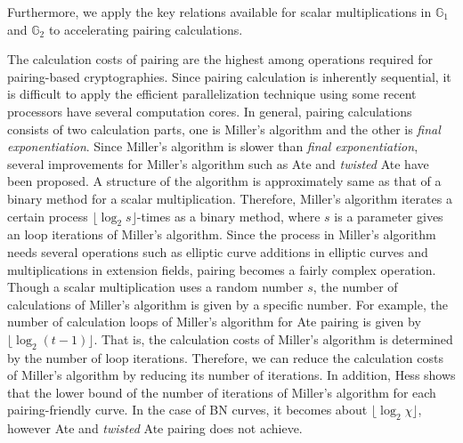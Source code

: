 Furthermore, we apply the key relations available for scalar multiplications in $\mathbb{G}_1$ and $\mathbb{G}_2$ to accelerating pairing calculations.

The calculation costs of pairing are the highest among operations required for pairing-based cryptographies.
Since pairing calculation is inherently sequential, it is difficult to apply the efficient parallelization technique using some recent processors have several computation cores.
In general, pairing calculations consists of two calculation parts, one is Miller's algorithm and the other is {\it final exponentiation}.
Since Miller's algorithm is slower than {\it final exponentiation}, several improvements for Miller's algorithm such as Ate and {\it twisted} Ate have been proposed.
A structure of the algorithm is approximately same as that of a binary method for a scalar multiplication.
Therefore, Miller's algorithm iterates a certain process $\lfloor \log_2 s \rfloor$-times as a binary method, where $s$ is a parameter gives an loop iterations of Miller's algorithm.
Since the process in Miller's algorithm needs several operations such as elliptic curve additions in elliptic curves and multiplications in extension fields, pairing becomes a fairly complex operation. 
Though a scalar multiplication uses a random number $s$, the number of calculations of Miller's algorithm is given by a specific number.
For example, the number of calculation loops of Miller's algorithm for Ate pairing is given by $\lfloor \log_2 (t-1) \rfloor$.
That is, the calculation costs of Miller's algorithm is determined by the number of loop iterations.
Therefore, we can reduce the calculation costs of Miller's algorithm by reducing its number of iterations.
In addition, Hess shows that the lower bound of the number of iterations of Miller's algorithm for each pairing-friendly curve.
In the case of BN curves, it becomes about $\lfloor \log_2 \chi \rfloor$, however Ate and {\it twisted} Ate pairing does not achieve.
  
